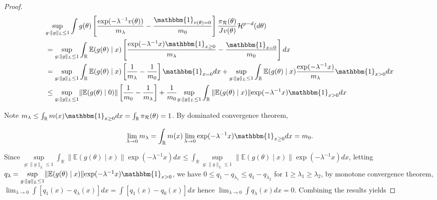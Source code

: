 \documentclass[10pt]{article}
\newcommand{\mc}[1]{\mathcal{#1}}
\DeclareMathOperator{\1}{\mathbbm{1}}
\begin{document}
\begin{proof}[Proof]
	\begin{equation}		
	\label{wass0}
		\begin{aligned}
	&\underset{g:\|g\|_L\le 1}\sup\int g(\theta)  \left[ \frac{ \exp(- \lambda^{-1} v(\theta)) } {  m_\lambda}  - 
	 \frac{ \mathbbm{1}_{v(\theta)=0} } {  m_0} 
	\right]  \frac{\pi_{\mc R}(\theta)}{Jv(\theta)} \mc H^{p-d}(d \theta) \\
	&= \underset{g:\|g\|_L\le 1}\sup\int_\mathbb{R}  \mathbb{E}(g(\theta) \mid x)  \left[ \frac{ \exp(- \lambda^{-1} x) \mathbbm{1}_{x \ge 0}} {  m_\lambda}  - 
	 \frac{ \mathbbm{1}_{x=0} } {  m_0} 
	\right] d x \\
		&=	\underset{g:\|g\|_L\le 1}\sup\int_\mathbb{R}  \mathbb{E}(g(\theta) \mid x)  \left[ \frac{  1} {  m_\lambda}  - 
	 \frac{ 1 } {  m_0} 
	\right]\mathbbm{1}_{x=0} d x  + \underset{g:\|g\|_L\le 1}\sup\int_\mathbb{R}  \mathbb{E}(g(\theta) \mid x)\frac{ \exp(- \lambda^{-1} x)} {  m_\lambda}  
	  \mathbbm{1}_{x > 0} d x \\
	& \le \underset{g:\|g\|_L\le 1}\sup \|\mathbb{E}(g(\theta) \mid 0)\| \left[ \frac{ 1 } {  m_0} -\frac{  1} {  m_\lambda}   
	 \right] + \frac{1} {  m_0} \underset{g:\|g\|_L\le 1}\sup \int_\mathbb{R}  \|\mathbb{E}(g(\theta) \mid x)\| { \exp(- \lambda^{-1} x)}
	\mathbbm{1}_{x > 0} d x \\	
	  \end{aligned}
	  \end{equation}
	  
	 	  
	Note $m_\lambda\le \int_\mathbb{R} m(x) \mathbbm{1}_{x \ge 0}  dx =\int_\mathbb{R} \pi_{\mc R}(\theta) =1$. By dominated convergence theorem, 

\begin{equation}
	\lim_{\lambda\rightarrow 0}m_\lambda= \int_\mathbb{R}  m(x) \lim_{\lambda\rightarrow 0}\exp(- \lambda^{-1} x ) \mathbbm{1}_{x \ge 0}  d x = m_0.
\end{equation}

	
	   Since 
	  $ \underset{g:\|g\|_L\le 1}\sup \int_\mathbb{R}  \|\mathbb{E}(g(\theta) \mid x)\| { \exp(- \lambda^{-1} x)} dx \le \int_\mathbb{R} \underset{g:\|g\|_L\le 1}\sup \|\mathbb{E}(g(\theta) \mid x)\| { \exp(- \lambda^{-1} x)} dx$,
	  letting $q_\lambda=	  \underset{g:\|g\|_L\le 1}\sup \|\mathbb{E}(g(\theta) \mid x)\| { \exp(- \lambda^{-1} x)}
	\mathbbm{1}_{x > 0}  $, we have $0\le q_1-q_{\lambda_1}\le q_1-q_{\lambda_2}$ for $1\ge\lambda_1\ge \lambda_2$, by monotone convergence theorem, $\lim_{\lambda\rightarrow 0}\int [ q_1(x)-q_\lambda(x)]dx = \int [q_1(x)- q_0(x) ]dx$ hence $\lim_{\lambda\rightarrow 0}\int q_\lambda(x)dx =0$. Combining the results yields 
	  

\end{proof}
\end{document}
